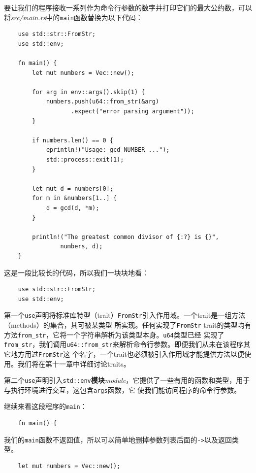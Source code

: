 \bigskip
{}
要让我们的程序接收一系列作为命令行参数的数字并打印它们的最大公约数，可以将\textit{src/main.rs}中的\texttt{main}函数替换为以下代码：
\begin{verbatim}
    use std::str::FromStr;
    use std::env;

    fn main() {
        let mut numbers = Vec::new();

        for arg in env::args().skip(1) {
            numbers.push(u64::from_str(&arg)
                   .expect("error parsing argument"));
        }

        if numbers.len() == 0 {
            eprintln!("Usage: gcd NUMBER ...");
            std::process::exit(1);
        }

        let mut d = numbers[0];
        for m in &numbers[1..] {
            d = gcd(d, *m);
        }

        println!("The greatest common divisor of {:?} is {}",
                numbers, d);
    }
\end{verbatim}

\smallskip
这是一段比较长的代码，所以我们一块块地看：
\begin{verbatim}
    use std::str::FromStr;
    use std::env;
\end{verbatim}

\smallskip
第一个\texttt{use}声明将标准库特型（trait）\texttt{FromStr}引入作用域。一个trait是一组方法（methods）的集合，其可被某类型
所实现。任何实现了\texttt{FromStr} trait的类型均有方法\texttt{from\_str}，它将一个字符串解析为该类型本身。\texttt{u64}类型已经
实现了\texttt{from\_str}，我们调用\texttt{u64::from\_str}来解析命令行参数。即便我们从未在该程序其它地方用过\texttt{FromStr}这
个名字，一个trait也必须被引入作用域才能提供方法以便使用。我们将在第十一章中详细讨论traits。

\medskip
第二个\texttt{use}声明引入\texttt{std::env}\textbf{模块}\textit{module}，它提供了一些有用的函数和类型，用于与执行环境进行交互，这包含\texttt{args}函数，它
使我们能访问程序的命令行参数。

\medskip
继续来看这段程序的\texttt{main}：
\begin{verbatim}
    fn main() {
\end{verbatim}

\smallskip
我们的\texttt{main}函数不返回值，所以可以简单地删掉参数列表后面的\texttt{->}以及返回类型。
\begin{verbatim}
    let mut numbers = Vec::new();
\end{verbatim}

